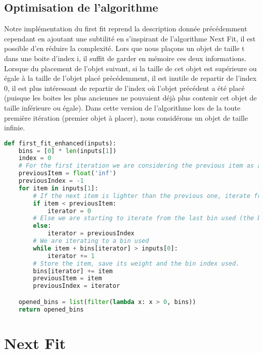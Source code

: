 \documentclass{article}
\begin{document}
\subsection{Optimisation de l'algorithme}
Notre implémentation du first fit reprend la description donnée précédemment cependant en ajoutant une subtilité en s'inspirant de l'algorithme Next Fit, il est possible d'en réduire la complexité.
Lors que nous plaçons un objet de taille t dans une boite d'index i, il suffit de garder en mémoire ces deux informations.
Lorsque du placement de l'objet suivant, si la taille de cet objet est supérieure ou égale à la taille de l'objet placé précédemment,
il est inutile de repartir de l'index 0, il est plus intéressant de repartir de l'index où l'objet précédent a été placé (puisque les boites les plus anciennes ne pouvaient déjà plus contenir cet objet 
de taille inférieure ou égale).
Dans cette version de l'algorithme lors de la toute première itération (premier objet à placer), nous considérons un objet de taille infinie.

\begin{lstlisting}[language=Python, frame=single]
def first_fit_enhanced(inputs):
    bins = [0] * len(inputs[1])
    index = 0
    # For the first iteration we are considering the previous item as an infinite weighted item.
    previousItem = float('inf')
    previousIndex = -1
    for item in inputs[1]:
        # If the next item is lighter than the previous one, iterate from 0
        if item < previousItem:
            iterator = 0
        # Else we are starting to iterate from the last bin used (the bins before are too full to be used).
        else:
            iterator = previousIndex
        # We are iterating to a bin used
        while item + bins[iterator] > inputs[0]:
            iterator += 1
        # Store the item, save its weight and the bin index used.
        bins[iterator] += item
        previousItem = item
        previousIndex = iterator

    opened_bins = list(filter(lambda x: x > 0, bins))
    return opened_bins
\end{lstlisting}



\section{Next Fit}
\end{document}
